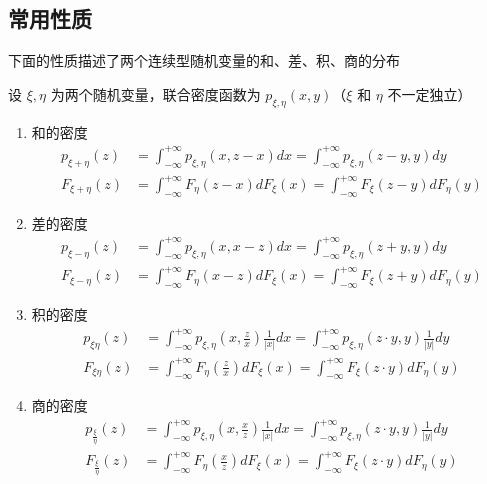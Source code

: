 \documentclass[12pt,a4paper]{amsart}
\begin{document}
\subsection{常用性质}

下面的性质描述了两个连续型随机变量的和、差、积、商的分布

\begin{proposition}
    设 $\xi, \eta$ 为两个随机变量，联合密度函数为 $p_{\xi, \eta}(x, y)$（$\xi$ 和 $\eta$ 不一定独立）
    \begin{enumerate}
        \item 和的密度
        \begin{equation}
            \begin{aligned}
                p_{\xi+\eta}(z) &= \int_{-\infty}^{+\infty}p_{\xi, \eta}(x, z-x)dx = \int_{-\infty}^{+\infty}p_{\xi, \eta}(z-y, y)dy \\
                F_{\xi+\eta}(z) &= \int_{-\infty}^{+\infty}F_{\eta}(z-x)dF_{\xi}(x) = \int_{-\infty}^{+\infty}F_{\xi}(z-y)dF_{\eta}(y)
            \end{aligned}
        \end{equation}
        \item 差的密度
        \begin{equation}
            \begin{aligned}
                p_{\xi-\eta}(z) &= \int_{-\infty}^{+\infty}p_{\xi, \eta}(x, x-z)dx = \int_{-\infty}^{+\infty}p_{\xi, \eta}(z+y, y)dy \\
                F_{\xi-\eta}(z) &= \int_{-\infty}^{+\infty}F_{\eta}(x-z)dF_{\xi}(x) = \int_{-\infty}^{+\infty}F_{\xi}(z+y)dF_{\eta}(y)
            \end{aligned}
        \end{equation}
        \item 积的密度
        \begin{equation}
            \begin{aligned}
                p_{\xi\eta}(z) &= \int_{-\infty}^{+\infty}p_{\xi, \eta}(x, \frac{z}{x})\frac{1}{|x|}dx = \int_{-\infty}^{+\infty}p_{\xi, \eta}(z\cdot y, y)\frac{1}{|y|}dy \\
                F_{\xi\eta}(z) &= \int_{-\infty}^{+\infty}F_{\eta}(\frac{z}{x})dF_{\xi}(x) = \int_{-\infty}^{+\infty}F_{\xi}(z\cdot y)dF_{\eta}(y)
            \end{aligned}
        \end{equation}
        \item 商的密度
        \begin{equation}
            \begin{aligned}
                p_{\frac{\xi}{\eta}}(z) &= \int_{-\infty}^{+\infty}p_{\xi, \eta}(x, \frac{x}{z})\frac{1}{|x|}dx = \int_{-\infty}^{+\infty}p_{\xi, \eta}(z\cdot y, y)\frac{1}{|y|}dy \\
                F_{\frac{\xi}{\eta}}(z) &= \int_{-\infty}^{+\infty}F_{\eta}(\frac{x}{z})dF_{\xi}(x) = \int_{-\infty}^{+\infty}F_{\xi}(z\cdot y)dF_{\eta}(y)
            \end{aligned}
        \end{equation}
    \end{enumerate}
\end{proposition}
\end{document}
